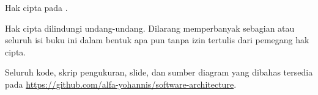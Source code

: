 \medskip
\noindent Hak cipta \textcopyright{}  pada
.

\noindent Hak cipta dilindungi undang-undang. Dilarang memperbanyak sebagian
atau seluruh isi buku ini dalam bentuk apa pun tanpa izin tertulis dari
pemegang hak cipta.

\medskip
\noindent Seluruh kode, skrip pengukuran, slide, dan sumber diagram yang
dibahas tersedia pada \url{https://github.com/alfa-yohannis/software-architecture}.
\clearpage
